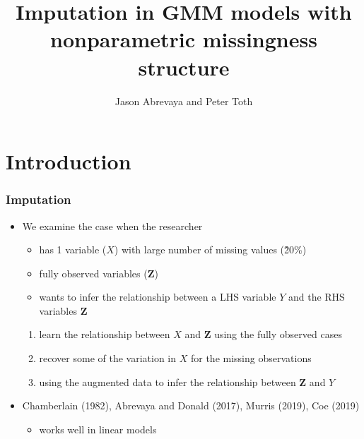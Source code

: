 \documentclass[compress,mathserif]{beamer}
\title{Imputation in GMM models with nonparametric missingness structure}
\author{Jason Abrevaya and Peter Toth
}
\institute{University of Texas at Austin, University of Nevada, Reno}
\date %
\begin{document}
\begin{frame}[plain]
  \titlepage
    \addtocounter{framenumber}{-1}
\end{frame}






\section{Introduction}\hypertarget{Introduction}{}


\begin{frame}\frametitle{Imputation}\hypertarget{Imputation}{}
\begin{itemize}
\item We examine the case when the researcher
\begin{itemize}
\item has 1 variable ($X$) with large number of missing values (\~20\%)

\item fully observed variables ($\mathbf{Z}$)

\item wants to infer the relationship between a LHS variable $Y$ and the RHS variables $\mathbf{Z}$
\end{itemize}

\begin{enumerate}
\item learn the relationship between $X$ and $\mathbf{Z}$ using the fully observed cases
\item recover some of the variation in $X$ for the missing observations
\item using the augmented data to infer the relationship between $\mathbf{Z}$ and $Y$
\end{enumerate}

\item Chamberlain (1982), Abrevaya and Donald (2017), Murris (2019), Coe (2019)
\begin{itemize}
\item works well in linear models


\end{itemize}

\end{itemize}
\end{frame}
\end{document}
